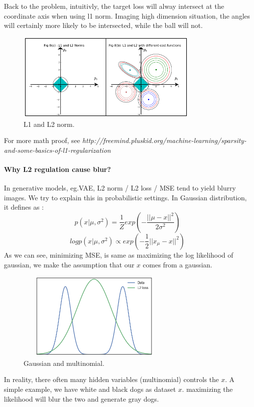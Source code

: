 \documentclass{article}
\begin{document}
\begin{CJK*}{UTF8}{gbsn}
Back to the problem, intuitivly, the target loss will alway intersect at the coordinate axis when using l1 norm. Imaging high dimension situation, the angles will certainly more likely to be intersected, while the ball will not.

\begin{figure}[H]
\centering
\includegraphics[width=3.5in,height=1.7in]{l1l2}
\caption{L1 and L2 norm.}
\end{figure}

For more math proof, see \textit{http://freemind.pluskid.org/machine-learning/sparsity-and-some-basics-of-l1-regularization}

\paragraph{Why L2 regulation cause blur?}

In generative models, eg.VAE, L2 norm / L2 loss / MSE tend to yield blurry images. We try to explain this in probabilistic settings. In Gaussian distribution, it defines as :
$$p(x|\mu,\sigma^{2})=\frac{1}{Z}exp\left( -\frac{||\mu-x||^{2}}{2\sigma^{2}}\right)$$
$$logp(x|\mu,\sigma^{2}) \propto exp\left(-\frac{1}{2}||x_{\mu}-x||^{2}  \right)$$
As we can see, minimizing MSE, is same as maximizing the log likelihood of gaussian, we make the assumption that our $x$ comes from a gaussian.


\begin{figure}[H]
\centering
\includegraphics[width=3in,height=1.7in]{l2}
\caption{Gaussian and multinomial.}
\end{figure}

In reality, there often many hidden variables (multinomial) controls the $x$. A simple example, we have white and black dogs as dataset $x$. maximizing the likelihood will blur the two and generate gray dogs.


\end{CJK*}
\end{document}
